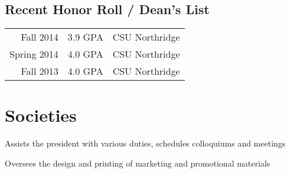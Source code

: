 \documentclass[letterpaper]{deedy-resume} %
\begin{document}
\begin{minipage}[t]{0.66\textwidth}
\subsection{Recent Honor Roll / Dean's List} 

\begin{tabular}{rll}
Fall 2014 & 3.9 GPA & CSU Northridge\\
Spring 2014 & 4.0 GPA & CSU Northridge\\
Fall 2013 & 4.0 GPA & CSU Northridge\\
\end{tabular}

\sectionspace %


\section{Societies}
\begin{tightitemize}
\item Assists the president with various duties, schedules colloquiums and meetings
\item Oversees the design and printing of marketing and promotional materials
\end{tightitemize}

\sectionspace %



\end{minipage} %




\end{document}
